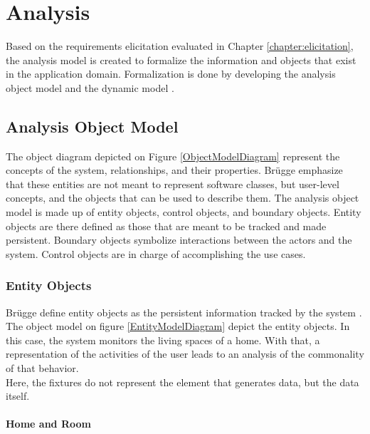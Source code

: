 		
\chapter{Analysis}
\label{chapter:analysis}
Based on the requirements elicitation evaluated in Chapter \ref{chapter:elicitation}, the analysis model is created to formalize the information and objects that exist in the application domain. 
Formalization is done by developing the analysis object model and the dynamic model \cite{Bruegge2004}.

\section{Analysis Object Model}


The object diagram depicted on Figure \ref{ObjectModelDiagram} represent the concepts of the system, relationships, and their properties. Br{\"u}gge \etAl \cite{Bruegge2004} emphasize that these entities are not meant to represent software classes, but user-level concepts, and the objects that can be used to describe them. 
The analysis object model is made up of entity objects, control objects, and boundary objects. Entity objects are there defined as those that are meant to be tracked and made persistent. Boundary objects symbolize interactions between the actors and the system. Control objects are in charge of accomplishing the use cases.\\


\subsection{Entity Objects}

Br{\"u}gge \etAl define entity objects as the persistent information tracked by the system \cite{Bruegge2004}. The object model on figure \ref{EntityModelDiagram} depict the entity objects. In this case, the system monitors the living spaces of a home. With that, a representation of the activities of the user leads to an analysis of the commonality of that behavior. \\
Here, the fixtures do not represent the element that generates data, but the data itself.

\subsubsection{Home and Room}

